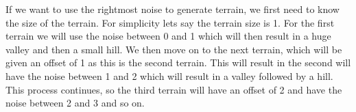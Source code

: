 If we want to use the rightmost noise to generate terrain, we first need to know the size of the terrain. For simplicity lets say the terrain size is 1. For the first terrain we will use the noise between 0 and 1 which will then result in a huge valley and then a small hill. We then move on to the next terrain, which will be given an offset of 1 as this is the second terrain. This will result in the second will have the noise between 1 and 2 which will result in a valley followed by a hill. This process continues, so the third terrain will have an offset of 2 and have the noise between 2 and 3 and so on.


